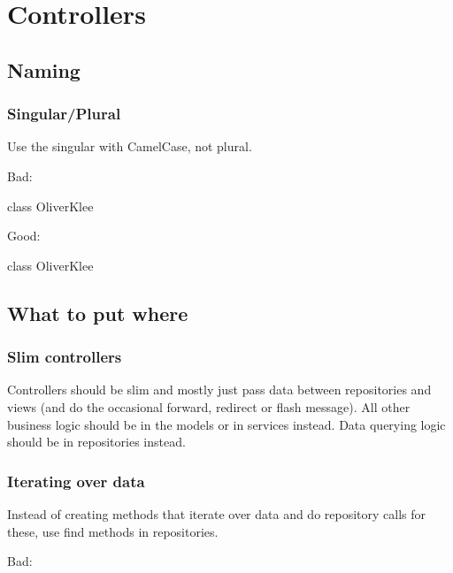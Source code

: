 \chapter{Controllers}

\section{Naming}

\subsection{Singular/Plural}

Use the singular with CamelCase, not plural.

Bad:

\begin{phpcode}
class OliverKlee\Books\Controller{}
\end{phpcode}

Good:

\begin{phpcode}
class OliverKlee\Books\Controller{}
\end{phpcode}


\section{What to put where}

\subsection{Slim controllers}

Controllers should be slim and mostly just pass data between repositories and views (and do the occasional forward, redirect or flash message).
All other business logic should be in the models or in services instead.
Data querying logic should be in repositories instead.


\subsection{Iterating over data}

Instead of creating methods that iterate over data and do repository calls for these, use find methods in repositories.

Bad:

